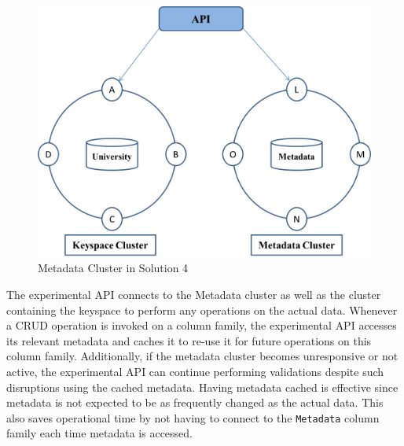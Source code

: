 \begin{figure}[h]
	\centering
	\includegraphics[width=.6\textwidth]{./figure/Solutions/Sol4-cluster-pic.png}
	\caption{Metadata Cluster in Solution
	4}\label{fd:MetadataCluster-Solution4}
	
\end{figure}
 The experimental \ac{API} connects to the Metadata cluster as well as
the cluster containing the keyspace to perform any operations on the actual
data.  Whenever a \ac{CRUD} operation is invoked on a column family,  the
experimental \ac{API} accesses its relevant metadata and caches it to re-use it
for future operations on this column family. 
Additionally, if the metadata cluster becomes unresponsive or not active,  the
experimental \ac{API} can continue performing validations despite such
disruptions using the cached metadata.
Having metadata cached is effective since metadata is not
expected to be as frequently changed as the actual data.  This also saves
operational time by not having to connect to the
\texttt{Metadata} column family each time  metadata is accessed. 




